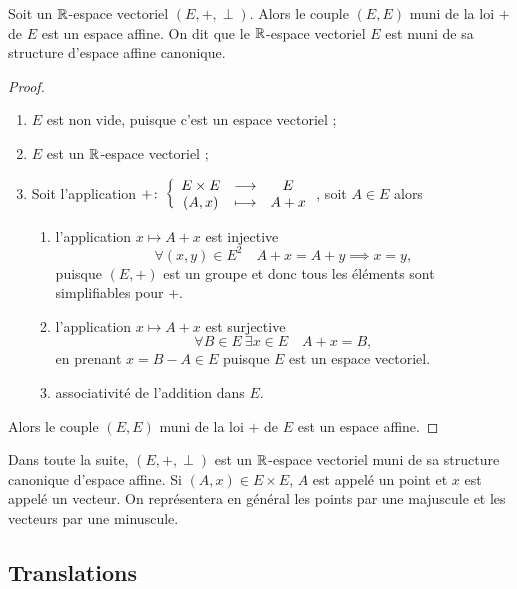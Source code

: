 \begin{prop}
  Soit un \(\mathbb{R}\)-espace vectoriel \((E,+,\perp)\). Alors le couple \((E,E)\)
  muni de la loi \(+\) de \(E\) est un espace affine. On dit que le
  \(\mathbb{R}\)-espace vectoriel \(E\) est muni de sa structure d'espace affine
  canonique.
\end{prop}
\begin{proof}
  \begin{enumerate}
    \item \(E\) est non vide, puisque c'est un espace vectoriel ;
    \item \(E\) est un \(\mathbb{R}\)-espace vectoriel ;
    \item Soit l'application \(+\colon\left\{\begin{array}{ccc}E\times E & \longrightarrow &E\\(A,x) & \longmapsto & A+x\end{array}\right.\), soit
      \(A \in E\) alors
      \begin{enumerate}
        \item l'application \(x \longmapsto A+x\) est injective
          \begin{equation}
            \forall (x,y) \in E^2 \quad A+x=A+y \implies x=y,
          \end{equation}
          puisque \((E,+)\) est un groupe et donc tous les éléments sont
          simplifiables pour \(+\).
        \item l'application \(x \longmapsto A+x\) est surjective
          \begin{equation}
            \forall B \in E \ \exists x \in E \quad A+x=B,
          \end{equation}
          en prenant \(x=B-A \in E\) puisque \(E\) est un espace vectoriel.
        \item associativité de l'addition dans \(E\).
      \end{enumerate}
  \end{enumerate}
  Alors le couple \((E,E)\) muni de la loi \(+\) de \(E\) est un espace affine.
\end{proof}

Dans toute la suite, \((E,+,\perp)\) est un \(\mathbb{R}\)-espace vectoriel muni de sa
structure canonique d'espace affine. Si \((A,x) \in E\times E\), \(A\) est
appelé un point et \(x\) est appelé un vecteur. On représentera en général les
points par une majuscule et les vecteurs par une minuscule.

\subsection{Translations}

